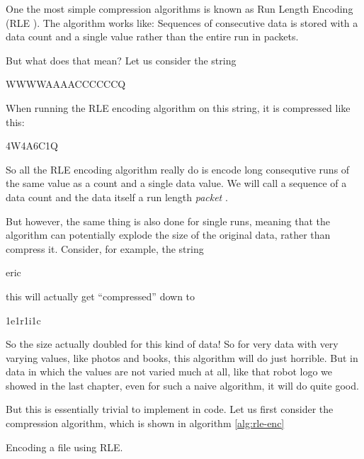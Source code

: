 \begin{refsection}
One the most simple compression algorithms is known as Run Length
Encoding (RLE
). \cite{nagarajan11:_enhan_approac_run_lengt_encod_schem}
The algorithm works like: Sequences of consecutive
data is stored with a data count and a single value rather than the entire
run in packets.

But what does that mean? Let us consider the string

\begin{indentpar}
  WWWWAAAACCCCCCQ
\end{indentpar}

When running the RLE encoding algorithm on this string, it is
compressed like this:

\begin{indentpar}
  4W4A6C1Q
\end{indentpar}

So all the RLE encoding algorithm really do is encode long consequtive
runs of the same value as a count and a single data value. We will call a
sequence of a data count and the data itself a run length
\textit{packet} .

But however, the same thing is also done for single runs, meaning that
the algorithm can potentially explode the size of the original data,
rather than compress it. Consider, for example, the string

\begin{indentpar}
  eric
\end{indentpar}

this will actually get ``compressed'' down to

\begin{indentpar}
  1e1r1i1c
\end{indentpar}

So the size actually doubled for this kind of data! So for very data
with very varying values, like photos and books, this algorithm will
do just horrible. But in data in which the values are not varied much
at all, like that robot logo we showed in the last chapter, even for such a
naive algorithm, it will do quite good.

But this is essentially trivial to implement in code. Let us first
consider the compression algorithm, which is shown in algorithm \ref{alg:rle-enc}

\newcommand{\eof}{\ensuremath{\VoidCall{EndOfFileReached}}}
\newcommand{\neof}{\ensuremath{\NOT \VoidCall{EndOfFileReached}}}

\begin{algorithm}[h]
  \caption{Encoding a file using RLE.}
  \label{alg:rle-enc}
  \begin{algorithmic}[1]


\end{algorithmic}
\end{algorithm}
\end{refsection}
